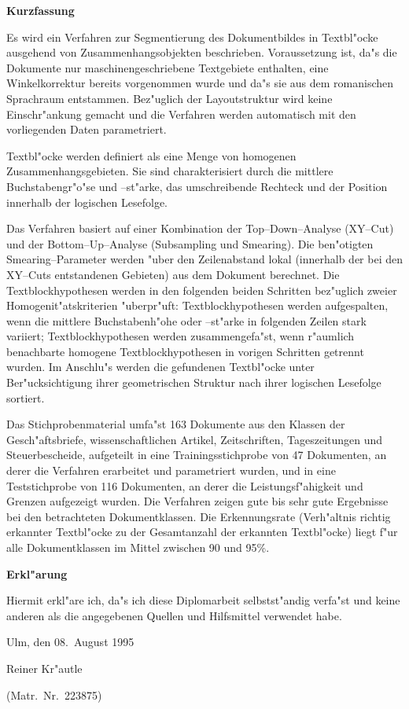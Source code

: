 \clearpage{\thispagestyle{empty}\cleardoublepage}
\thispagestyle{empty}
\begin{small}
  \centerline{\bf Kurzfassung}

  Es wird ein Verfahren zur Segmentierung des Dokumentbildes in Textbl"ocke ausgehend
  von Zusammenhangsobjekten beschrieben.
  Voraussetzung ist, da"s die Dokumente nur maschinengeschriebene Textgebiete
  enthalten, eine Winkelkorrektur bereits vorgenommen wurde und da"s sie aus dem romanischen
  Sprachraum entstammen. Bez"uglich der Layoutstruktur wird keine Einschr"ankung gemacht und die
  Verfahren werden automatisch mit den vorliegenden Daten parametriert.

  Textbl"ocke werden definiert als eine Menge von homogenen Zusammenhangsgebieten. Sie sind
  charakterisiert durch die mittlere Buchstabengr"o"se und --st"arke, das umschreibende Rechteck
  und der Position innerhalb der logischen Lesefolge.

  Das Verfahren basiert auf einer Kombination der Top--Down--Analyse (XY--Cut) und der
  Bottom--Up--Analyse (Subsampling und Smearing).
  Die ben"otigten Smearing--Parameter werden "uber den Zeilenabstand lokal
  (innerhalb der bei den XY--Cuts entstandenen Gebieten) aus dem Dokument berechnet.
  Die Textblockhypothesen werden in den folgenden beiden Schritten bez"uglich zweier
  Homogenit"atskriterien "uberpr"uft: Textblockhypothesen werden aufgespalten, wenn die
  mittlere Buchstabenh"ohe oder --st"arke in folgenden Zeilen stark variiert;
  Textblockhypothesen werden zusammengefa"st, wenn r"aumlich benachbarte homogene
  Textblockhypothesen in vorigen Schritten getrennt wurden.
  Im Anschlu"s werden die gefundenen Textbl"ocke unter Ber"ucksichtigung ihrer geometrischen Struktur nach ihrer logischen Lesefolge sortiert.

  Das Stichprobenmaterial umfa"st 163 Dokumente aus den Klassen der Gesch"aftsbriefe,
  wissenschaftlichen Artikel, Zeitschriften, Tageszeitungen und Steuerbescheide,
  aufgeteilt in eine Trainingsstichprobe von 47 Dokumenten,
  an derer die Verfahren erarbeitet und parametriert wurden, und in eine Teststichprobe
  von 116 Dokumenten, an derer die Leistungsf"ahigkeit und Grenzen aufgezeigt wurden.
  Die Verfahren zeigen gute bis sehr gute Ergebnisse bei den betrachteten Dokumentklassen.
  Die Erkennungsrate (Verh"altnis richtig erkannter Textbl"ocke zu der Gesamtanzahl der erkannten
  Textbl"ocke)
  liegt f"ur alle Dokumentklassen im Mittel zwischen 90 und 95\%.
\end{small}
\vfill
{\bf Erkl"arung}

Hiermit erkl"are ich, da"s ich diese Diplomarbeit selbstst"andig verfa"st und keine anderen
als die angegebenen Quellen und Hilfsmittel verwendet habe.

\vspace*{2cm}

Ulm, den 08.\ August 1995\hfill
\begin{minipage}[t]{5cm}
  \centerline{Reiner Kr"autle}
  \centerline{\small (Matr.~Nr.~223875)}
\end{minipage}
\hspace*{\fill}
\clearpage{\thispagestyle{empty}\cleardoublepage}
